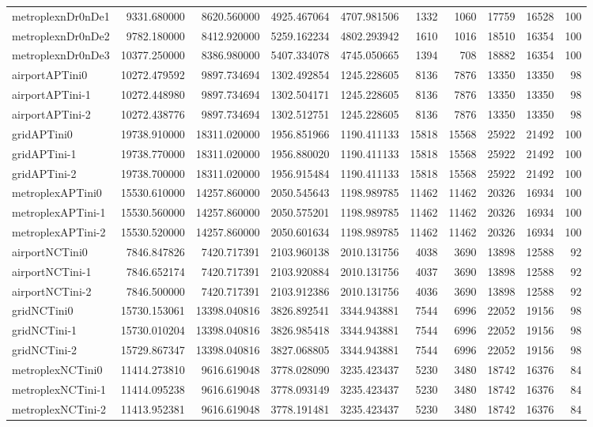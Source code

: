 \begin{longtable}{|l|r|r|r|r|r|r|r|r|r|}
metroplexnDr0nDe1 & 9331.680000 & 8620.560000 & 4925.467064 & 4707.981506 & 1332 & 1060 & 17759 & 16528 & 100 \\
metroplexnDr0nDe2 & 9782.180000 & 8412.920000 & 5259.162234 & 4802.293942 & 1610 & 1016 & 18510 & 16354 & 100 \\
metroplexnDr0nDe3 & 10377.250000 & 8386.980000 & 5407.334078 & 4745.050665 & 1394 & 708 & 18882 & 16354 & 100 \\
airportAPTini0 & 10272.479592 & 9897.734694 & 1302.492854 & 1245.228605 & 8136 & 7876 & 13350 & 13350 & 98 \\
airportAPTini-1 & 10272.448980 & 9897.734694 & 1302.504171 & 1245.228605 & 8136 & 7876 & 13350 & 13350 & 98 \\
airportAPTini-2 & 10272.438776 & 9897.734694 & 1302.512751 & 1245.228605 & 8136 & 7876 & 13350 & 13350 & 98 \\
gridAPTini0 & 19738.910000 & 18311.020000 & 1956.851966 & 1190.411133 & 15818 & 15568 & 25922 & 21492 & 100 \\
gridAPTini-1 & 19738.770000 & 18311.020000 & 1956.880020 & 1190.411133 & 15818 & 15568 & 25922 & 21492 & 100 \\
gridAPTini-2 & 19738.700000 & 18311.020000 & 1956.915484 & 1190.411133 & 15818 & 15568 & 25922 & 21492 & 100 \\
metroplexAPTini0 & 15530.610000 & 14257.860000 & 2050.545643 & 1198.989785 & 11462 & 11462 & 20326 & 16934 & 100 \\
metroplexAPTini-1 & 15530.560000 & 14257.860000 & 2050.575201 & 1198.989785 & 11462 & 11462 & 20326 & 16934 & 100 \\
metroplexAPTini-2 & 15530.520000 & 14257.860000 & 2050.601634 & 1198.989785 & 11462 & 11462 & 20326 & 16934 & 100 \\
airportNCTini0 & 7846.847826 & 7420.717391 & 2103.960138 & 2010.131756 & 4038 & 3690 & 13898 & 12588 & 92 \\
airportNCTini-1 & 7846.652174 & 7420.717391 & 2103.920884 & 2010.131756 & 4037 & 3690 & 13898 & 12588 & 92 \\
airportNCTini-2 & 7846.500000 & 7420.717391 & 2103.912386 & 2010.131756 & 4036 & 3690 & 13898 & 12588 & 92 \\
gridNCTini0 & 15730.153061 & 13398.040816 & 3826.892541 & 3344.943881 & 7544 & 6996 & 22052 & 19156 & 98 \\
gridNCTini-1 & 15730.010204 & 13398.040816 & 3826.985418 & 3344.943881 & 7544 & 6996 & 22052 & 19156 & 98 \\
gridNCTini-2 & 15729.867347 & 13398.040816 & 3827.068805 & 3344.943881 & 7544 & 6996 & 22052 & 19156 & 98 \\
metroplexNCTini0 & 11414.273810 & 9616.619048 & 3778.028090 & 3235.423437 & 5230 & 3480 & 18742 & 16376 & 84 \\
metroplexNCTini-1 & 11414.095238 & 9616.619048 & 3778.093149 & 3235.423437 & 5230 & 3480 & 18742 & 16376 & 84 \\
metroplexNCTini-2 & 11413.952381 & 9616.619048 & 3778.191481 & 3235.423437 & 5230 & 3480 & 18742 & 16376 & 84 \\
\end{longtable}
